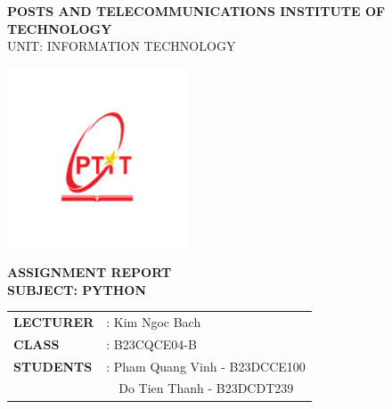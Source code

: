 \documentclass[a4paper,12pt]{article}
\begin{document}

\begin{center}

    {\Large \textbf{POSTS AND TELECOMMUNICATIONS INSTITUTE OF TECHNOLOGY}} \\
    \vspace{0.2cm}
    {\small UNIT: INFORMATION TECHNOLOGY} \\
    \vspace{0.5cm}
    
    \includegraphics[width=0.4\textwidth]{images/logo.png} \\
    \vspace{0.5cm}
    
    {\Large \textbf{ASSIGNMENT REPORT}} \\
    \vspace{0.2cm}
    {\large \textbf{SUBJECT: PYTHON}} \\
    \vspace{1.5cm}
    
    \begin{center}
    \begin{tabular}{ll}
    \vspace{0.3cm}
    
    \textbf{LECTURER} & : Kim Ngoc Bach \\
    \vspace{0.3cm}
    
    \textbf{CLASS} & : B23CQCE04-B\\
    \vspace{0.3cm}
    
    \textbf{STUDENTS} & : Pham Quang Vinh - B23DCCE100\\
    & \ \ Do Tien Thanh - B23DCDT239
    \end{tabular}
    \end{center}
\end{center}
\newpage
\end{document}
